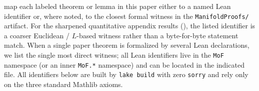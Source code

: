 \documentclass[11pt]{article}
\begin{document}
map each labeled theorem or lemma in this paper either to a named Lean
identifier or, where noted, to the closest formal witness in the
\texttt{ManifoldProofs/} artifact. For the sharpened quantitative appendix results
(), the listed identifier is a coarser
Euclidean / $L$-based witness rather than a byte-for-byte statement
match. When a single paper theorem is formalized by several Lean
declarations, we list the single most direct witness; all Lean
identifiers live in the \texttt{MoF} namespace (or an inner
\texttt{MoF.*} namespace) and can be located in the indicated file.
All identifiers below are built by
\texttt{lake build} with zero \texttt{sorry} and rely only on the
three standard Mathlib axioms.
\end{document}
